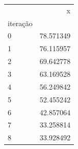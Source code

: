 \begin{tabular}{lr}
\toprule
 & x \\
iteração &  \\
\midrule
0 & 78.571349 \\
1 & 76.115957 \\
2 & 69.642778 \\
3 & 63.169528 \\
4 & 56.249842 \\
5 & 52.455242 \\
6 & 42.857064 \\
7 & 33.258814 \\
8 & 33.928492 \\
\bottomrule
\end{tabular}
